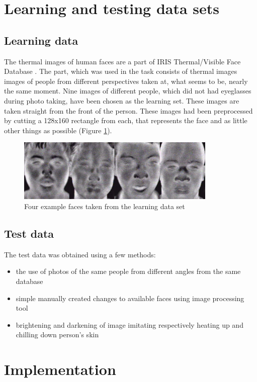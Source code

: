 \documentclass[pdftex]{article}
\begin{document}
\section{Learning and testing data sets}
\subsection{Learning data}
The thermal images of human faces are a part of  IRIS Thermal/Visible Face Database \cite{dataset}. The part, which was used in the task consists of thermal images images of people from different perspectives taken at, what seems to be, nearly the same moment. Nine images of different people, which did not had eyeglasses during photo taking, have been chosen as the learning set. These images are taken straight from the front of the person. These images had been preprocessed by cutting a 128x160 rectangle from each, that represents the face and as little other things as possible (Figure \ref{faces}).
\begin{figure}[!htb]
	\centering
	\includegraphics[width=0.85\textwidth]{pictures/faces.png} 
	\caption{Four example faces taken from the learning data set}
	\label{faces}
\end{figure}

\subsection{Test data}
The test data was obtained using a few methods:
\begin{itemize}
\item{the use of photos of the same people from different angles from the same database}
\item{simple manually created changes to available faces using image processing tool}
\item{brightening and darkening of image imitating respectively heating up and chilling down person's skin}
\end{itemize}

\clearpage
\section{Implementation}
\end{document}
